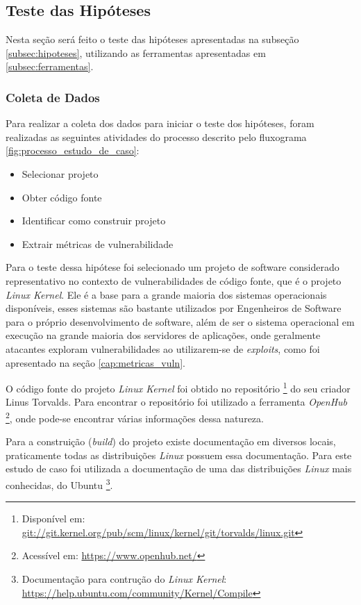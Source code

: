 \subsection{Teste das Hipóteses} \label{subsec:teste_hipotese}

Nesta seção será feito o teste das hipóteses apresentadas na subseção
\ref{subsec:hipoteses}, utilizando as ferramentas apresentadas em \ref{subsec:ferramentas}.

\subsubsection{Coleta de Dados}

Para realizar a coleta dos dados para iniciar o teste dos hipóteses, foram
realizadas as seguintes atividades do processo descrito pelo fluxograma
\ref{fig:processo_estudo_de_caso}:

\begin{itemize}
  \item Selecionar projeto
  \item Obter código fonte
  \item Identificar como construir projeto
  \item Extrair métricas de vulnerabilidade
\end{itemize}

Para o teste dessa hipótese foi selecionado um projeto de software considerado
representativo no contexto de vulnerabilidades de código fonte, que é o projeto
\emph{Linux Kernel}. Ele é a base para a grande maioria dos sistemas operacionais
disponíveis, esses sistemas são bastante utilizados por Engenheiros de Software para
o próprio desenvolvimento de software, além de ser o sistema operacional em
execução na grande maioria dos servidores de aplicações, onde geralmente
atacantes exploram vulnerabilidades ao utilizarem-se de \textit{exploits}, como
foi apresentado na seção \ref{cap:metricas_vuln}.

O código fonte do projeto \emph{Linux Kernel} foi obtido no repositório \footnote{Disponível em:
\url{git://git.kernel.org/pub/scm/linux/kernel/git/torvalds/linux.git}} do seu
criador Linus Torvalds. Para encontrar o repositório foi utilizado a ferramenta
\emph{OpenHub} \footnote{Acessível em: \url{https://www.openhub.net/}}, onde
pode-se encontrar várias informações dessa natureza.

Para a construição (\textit{build}) do projeto existe documentação em diversos
locais, praticamente todas as distribuições \emph{Linux} possuem essa
documentação. Para este estudo de caso foi utilizada a documentação de uma das
distribuições \emph{Linux} mais conhecidas, do Ubuntu \footnote{Documentação para
  contrução do \emph{Linux Kernel}:
\url{https://help.ubuntu.com/community/Kernel/Compile}}.

